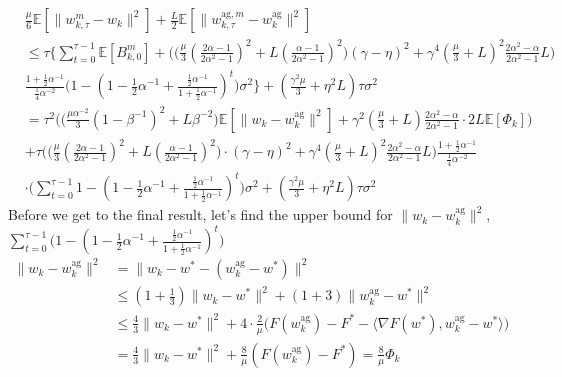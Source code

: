 \documentclass[11pt]{article}
\begin{document}
\begin{align*}
    &\frac{\mu}{6}\mathbb{E}[\|w_{k, \tau}^m - w_k\|^2] + \frac{L}{2} \mathbb{E}[\|w_{k, \tau}^{\textrm{ag}, m} - w_k^{\textrm{ag}}\|^2] \\
    &\leq \tau \Big\{ \sum_{t=0}^{\tau-1} \mathbb{E}[B_{k, 0}^m] + \bigg( \Big(\frac{\mu}{3} (\frac{2\alpha-1}{2\alpha^2 -1})^2 + L(\frac{\alpha-1}{2\alpha^2 -1})^2 \Big)(\gamma - \eta)^2 + \gamma^4 (\frac{\mu}{3} + L)^2 \frac{2\alpha^2 - \alpha}{2\alpha^2 - 1}L \bigg) \\
    &\frac{1 + \frac{1}{2}\alpha^{-1}}{\frac{1}{4}\alpha^{-2}} \Big( 1-(1-\frac{1}{2}\alpha^{-1}+\frac{\frac{1}{2}\alpha^{-1}}{1+\frac{1}{2}\alpha^{-1}})^t\Big)\sigma^2\Big\} + (\frac{\gamma^2\mu}{3}+\eta^2 L)\tau\sigma^2 \\
    &= \tau^2 \bigg(\Big( \frac{\mu\alpha^{-2}}{3}(1-\beta^{-1})^2 + L\beta^{-2}\Big)\mathbb{E}[\|w_k-w_k^{\textrm{ag}}\|^2] + \gamma^2(\frac{\mu}{3} + L)\frac{2\alpha^2-\alpha}{2\alpha^2-1}\cdot 2L\mathbb{E}[\Phi_{k}]\bigg) \\
    &+ \tau \bigg( \Big(\frac{\mu}{3} (\frac{2\alpha-1}{2\alpha^2 -1})^2 + L(\frac{\alpha-1}{2\alpha^2 -1})^2 \Big) \cdot (\gamma - \eta)^2 + \gamma^4 (\frac{\mu}{3} + L)^2 \frac{2\alpha^2 - \alpha}{2\alpha^2 - 1}L \bigg) \frac{1 + \frac{1}{2}\alpha^{-1}}{\frac{1}{4}\alpha^{-2}} \\
    &\cdot \Big(\sum_{t=0}^{\tau-1} 1-(1-\frac{1}{2}\alpha^{-1}+\frac{\frac{1}{2}\alpha^{-1}}{1+\frac{1}{2}\alpha^{-1}})^t\Big)\sigma^2 + (\frac{\gamma^2\mu}{3}+\eta^2 L)\tau\sigma^2
\end{align*}
Before we get to the final result, let's find the upper bound for $\|w_k - w_k^{\textrm{ag}}\|^2$, $\sum_{t=0}^{\tau-1}\Big( 1-(1-\frac{1}{2}\alpha^{-1}+\frac{\frac{1}{2}\alpha^{-1}}{1+\frac{1}{2}\alpha^{-1}})^t\Big)$
\begin{align*}
    \|w_k - w_k^{\textrm{ag}}\|^2 &= \|w_k - w^* -(w_k^{\textrm{ag}}-w^*)\|^2 \nonumber\\
    &\leq (1+\frac{1}{3})\|w_k - w^*\|^2 + (1+3)\|w_k^{
    \textrm{ag}}-w^*\|^2 \nonumber\\
    &\leq \frac{4}{3}\|w_k - w^*\|^2 + 4\cdot \frac{2}{\mu}\Big(F(w_k^{\textrm{ag}})-F^*-\langle\nabla F(w^*),w_k^{\textrm{ag}}-w^*\rangle\Big) \nonumber\\
    &= \frac{4}{3}\|w_k-w^*\|^2 + \frac{8}{\mu}(F(w_k^{\textrm{ag}})-F^*) = \frac{8}{\mu}\Phi_k
\end{align*}
\end{document}
